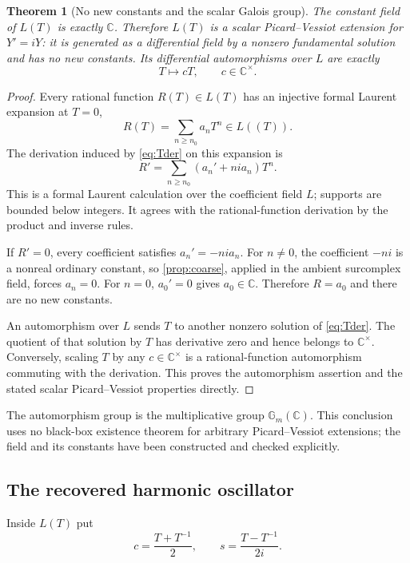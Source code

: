 \documentclass[11pt,letterpaper]{article}
\numberwithin{equation}{section}
\newtheorem{theorem}{Theorem}[section]
\theoremstyle{definition}
\theoremstyle{remark}
\newcommand{\C}{\mathbb C}
\begin{document}
\begin{theorem}[No new constants and the scalar Galois group]\label{thm:PV}
The constant field of $L(T)$ is exactly $\C$. Therefore $L(T)$ is a scalar Picard--Vessiot extension for $Y'=iY$: it is generated as a differential field by a nonzero fundamental solution and has no new constants. Its differential automorphisms over $L$ are exactly
\[
 T\longmapsto cT,\qquad c\in\C^\times.
\]
\end{theorem}
\begin{proof}
Every rational function $R(T)\in L(T)$ has an injective formal Laurent expansion at $T=0$,
\[
 R(T)=\sum_{n\geq n_0}a_nT^n\in L((T)).
\]
The derivation induced by \eqref{eq:Tder} on this expansion is
\[
 R'=
 \sum_{n\geq n_0}(a_n'+ni a_n)T^n.
\]
This is a formal Laurent calculation over the coefficient field $L$; supports are bounded below integers. It agrees with the rational-function derivation by the product and inverse rules.

If $R'=0$, every coefficient satisfies $a_n'=-ni a_n$. For $n\ne0$, the coefficient $-ni$ is a nonreal ordinary constant, so \cref{prop:coarse}, applied in the ambient surcomplex field, forces $a_n=0$. For $n=0$, $a_0'=0$ gives $a_0\in\C$. Therefore $R=a_0$ and there are no new constants.

An automorphism over $L$ sends $T$ to another nonzero solution of \eqref{eq:Tder}. The quotient of that solution by $T$ has derivative zero and hence belongs to $\C^\times$. Conversely, scaling $T$ by any $c\in\C^\times$ is a rational-function automorphism commuting with the derivation. This proves the automorphism assertion and the stated scalar Picard--Vessiot properties directly.
\end{proof}

The automorphism group is the multiplicative group $\mathbb G_m(\C)$. This conclusion uses no black-box existence theorem for arbitrary Picard--Vessiot extensions; the field and its constants have been constructed and checked explicitly.

\subsection{The recovered harmonic oscillator}
Inside $L(T)$ put
\begin{equation}\label{eq:csT}
 c=\frac{T+T^{-1}}2,\qquad
 s=\frac{T-T^{-1}}{2i}.
\end{equation}
\end{document}
